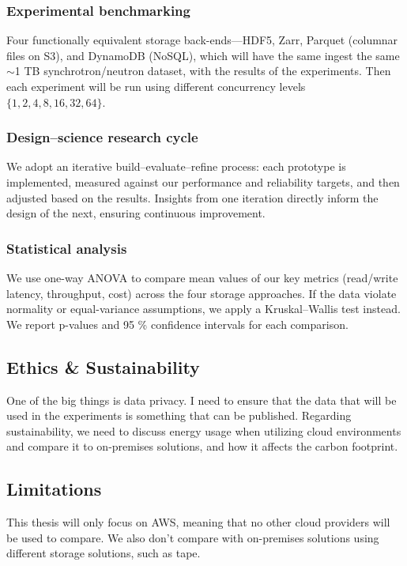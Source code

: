 \documentclass{article}
\begin{document}
\subsubsection{Experimental benchmarking}
Four functionally equivalent storage back-ends—HDF5, Zarr, Parquet (columnar files on S3), and DynamoDB (NoSQL), which will have the same ingest the same $\sim$1 TB synchrotron/neutron dataset, with the results of the experiments. Then each experiment will be run using different concurrency levels $\{1,2,4,8,16,32,64\}$.

\subsubsection{Design–science research cycle}
We adopt an iterative build–evaluate–refine process: each prototype is implemented, measured against our performance and reliability targets, and then adjusted based on the results. Insights from one iteration directly inform the design of the next, ensuring continuous improvement.

\subsubsection{Statistical analysis}
We use one-way ANOVA to compare mean values of our key metrics (read/write latency, throughput, cost) across the four storage approaches. If the data violate normality or equal-variance assumptions, we apply a Kruskal–Wallis test instead. We report p-values and 95 \% confidence intervals for each comparison.



\subsection{Ethics \& Sustainability}
One of the big things is data privacy. I need to ensure that the data that will be used in the experiments is something that can be published. Regarding sustainability, we need to discuss energy usage when utilizing cloud environments and compare it to on-premises solutions, and how it affects the carbon footprint.

\subsection{Limitations}
This thesis will only focus on AWS, meaning that no other cloud providers will be used to compare. We also don't compare with on-premises solutions using different storage solutions, such as tape.
\end{document}
